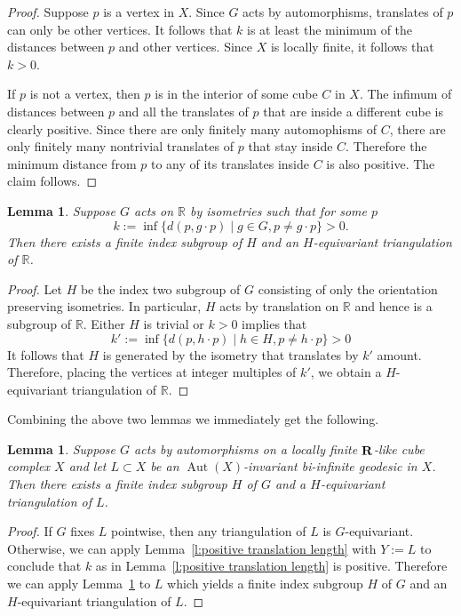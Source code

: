 \documentclass{amsart}
\newtheorem{lemma}[theorem]{Lemma}
\theoremstyle{definition}
\newtheorem*{Notation warning}{Warning on notations}
\newtheorem*{Sketch of proof}{Sketch of proof for Theorem C}
\DeclareMathOperator{\R}{\bf{R}}
\def\aut{\mathop{\mathrm{Aut}}\nolimits}
\begin{document}
\begin{sloppypar}
\begin{proof}
Suppose $p$ is a vertex in $X$. Since $G$ acts by automorphisms, translates of $p$ can only be other vertices. It follows that $k$ is at least the minimum of the distances between $p$ and other vertices. Since $X$ is locally finite, it follows that $k>0$.

  If $p$ is not a vertex, then $p$ is in the interior of some cube $C$ in $X$. The infimum of distances between $p$ and all the translates of $p$ that are inside a different cube is clearly positive.
  Since there are only finitely many automophisms of $C$, there are only finitely many nontrivial translates of $p$ that stay inside $C$. Therefore the minimum distance from $p$ to any of its translates inside $C$ is also positive. The claim follows.
\end{proof}

\begin{lemma}\label{l:translation length to triangulation}
    Suppose $G$ acts on $\mathbb{R}$ by isometries such that for some $p$
    \[k:=\inf\{d(p,g\cdot p)\mid g\in G,p\neq g\cdot p\}>0.
    \]
    Then there exists a finite index subgroup of $H$ and an $H$-equivariant triangulation of $\mathbb{R}$. 
\end{lemma}

\begin{proof}
Let $H$ be the  index two subgroup of $G$ consisting of only the orientation preserving isometries.
In particular, $H$ acts by translation on $\mathbb{R}$ and hence is a subgroup of $\mathbb{R}$.
Either $H$ is trivial or $k>0$ implies that
\[
k':=\inf\{d(p,h\cdot p)\mid h\in H,p\neq h\cdot p\}>0
\]
It follows that $H$ is generated by the isometry that translates by $k'$ amount.
Therefore,  placing the vertices at integer multiples of $k'$, we obtain a $H$-equivariant triangulation of $\mathbb{R}$.
\end{proof}
Combining the above two lemmas we immediately get the following.
\begin{lemma}\label{cubification}
    Suppose $G$ acts by automorphisms on a locally finite $\R$-like cube complex $X$ and let $L
\subset X$ be an $\aut(X)$-invariant bi-infinite geodesic in $X$. Then there exists a finite index subgroup $H$ of $G$ and a $H$-equivariant triangulation of $L$.
\end{lemma}
\begin{proof}
    If $G$ fixes $L$ pointwise, then any triangulation of $L$ is $G$-equivariant.
    Otherwise, we can apply  Lemma~\ref{l:positive translation length} with $Y:=L$ to conclude that $k$ as in Lemma~\ref{l:positive translation length} is positive. 
    Therefore we can apply Lemma~\ref{l:translation length to triangulation} to $L$ which yields a finite index subgroup $H$ of $G$ and an $H$-equivariant triangulation of $L$.
\end{proof}



\end{sloppypar}
\end{document}
